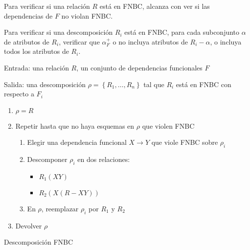 \documentclass[a4paper, twoside]{article}
\begin{document}
Para verificar si una relación $R$ está en FNBC, alcanza con ver
si las dependencias de $F$ no violan FNBC.

Para verificar si una descomposición $R_{i}$ está en FNBC, para cada
subconjunto $\alpha$ de atributos de $R_{i}$, verificar que $\alpha_{F}^{+}$
o no incluya atributos de $R_{i}-\alpha$, o incluya todos los atributos
de $R_{i}$.

\begin{algorithm}[H]
Entrada: una relación $R$, un conjunto de dependencias funcionales
$F$

Salida: una descomposición $\rho=\left\{ R_{1},\ldots,R_{n}\right\} $
tal que $R_{i}$ está en FNBC con respecto a $F_{i}$
\begin{enumerate}
\item $\rho=R$
\item Repetir hasta que no haya esquemas en $\rho$ que violen FNBC

\begin{enumerate}
\item Elegir una dependencia funcional $X\to Y$ que viole FNBC sobre $\rho_{i}$
\item Descomponer $\rho_{i}$ en dos relaciones:

\begin{itemize}
\item $R_{1}(XY)$
\item $R_{2}(X(R-XY))$
\end{itemize}
\item En $\rho$, reemplazar $\rho_{i}$ por $R_{1}$ y $R_{2}$
\end{enumerate}
\item Devolver $\rho$
\end{enumerate}
\protect\caption{Descomposición FNBC}


\end{algorithm}
\end{document}
